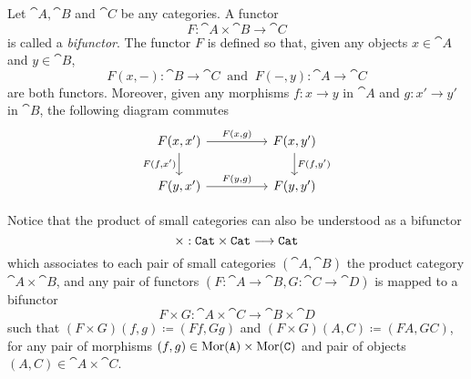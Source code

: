 \begin{proposition}[Bifunctor]\label{def:bifunctor}
    Let \(\cat A, \cat B\) and \(\cat C\) be any categories. A functor
    \[
        F: \cat A \times \cat B \longrightarrow \cat C
    \]
    is called a \emph{bifunctor}. The functor \(F\) is defined so that, given any
    objects \(x \in \cat A\) and \(y \in \cat B\),
    \[
        F(x, -): \cat B \longrightarrow \cat C\ \text{ and }\
        F(-, y): \cat A \longrightarrow \cat C
    \]
    are both functors. Moreover, given any morphisms \(f: x \to y\) in \(\cat A\)
    and \(g: x' \to y'\) in \(\cat B\), the following diagram commutes
    \[
        \begin{tikzcd}
            F(x, x') \ar[rr, "F{(x, g)}"] \ar[d, swap, "F{(f, x')}"]
            & &F(x, y') \ar[d, "F{(f, y')}"] \\
            F(y, x') \ar[rr, "F{(y, g)}"]
            & &F(y, y')
        \end{tikzcd}
    \]
\end{proposition}

Notice that the product of small categories can also be understood as a
bifunctor
\[
    \times: {\texttt{Cat}} \times {\texttt{Cat}} \longrightarrow {\texttt{Cat}}
\]
which associates to each pair of small categories \((\cat A, \cat B)\) the
product category \(\cat A \times \cat B\), and any pair of functors
\((F: \cat A \to \cat B, G: \cat C \to \cat D)\) is mapped to a bifunctor
\[
    F \times G: \cat A \times \cat C \to \cat B \times \cat D
\]
such that \((F \times G)(f, g) \coloneq (F f, G g)\) and
\((F \times G)(A, C) \coloneq (F A, G C)\), for any pair of morphisms
\((f, g) \in \operatorname{Mor}(\texttt A) \times \operatorname{Mor}(\texttt C)\) and pair of objects
\((A, C) \in \cat A \times \cat C\).

